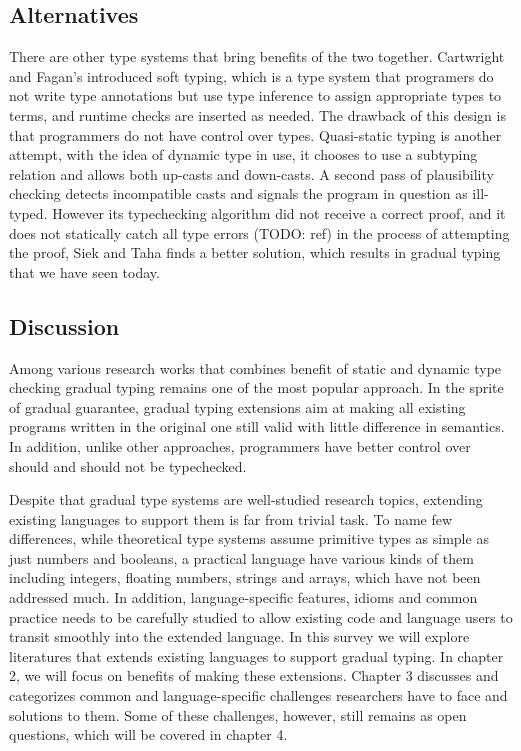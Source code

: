 \subsection{Alternatives}

There are other type systems that bring benefits of the two together.
Cartwright and Fagan's introduced soft typing, which is a type system
that programers do not write type annotations but use type inference to
assign appropriate types to terms, and runtime checks are inserted as needed.
The drawback of this design is that programmers do not have control over types.
Quasi-static typing is another attempt, with the idea of dynamic type in use,
it chooses to use a subtyping relation and allows both up-casts and down-casts.
A second pass of plausibility checking detects incompatible casts and signals the program
in question as ill-typed. However its typechecking algorithm did not receive a correct proof,
and it does not statically catch all type errors (TODO: ref)
in the process of attempting the proof, Siek and Taha finds a better solution, 
which results in gradual typing that we have seen today.

\subsection{Discussion}

Among various research works that combines
benefit of static and dynamic type checking
gradual typing remains one of the most popular approach.
In the sprite of gradual guarantee, gradual typing extensions aim at
making all existing programs written in the original one still valid with little difference in semantics.
In addition, unlike other approaches, programmers have better control over should and should not be typechecked.

Despite that gradual type systems are well-studied research topics,
extending existing languages to support them is far from trivial task.
To name few differences, while theoretical type systems assume primitive types as simple as just numbers and booleans,
a practical language have various kinds of them including integers, floating numbers, strings and arrays,
which have not been addressed much.
In addition, language-specific features, idioms and common practice needs
to be carefully studied to allow existing code and language users to transit smoothly into
the extended language. In this survey we will explore literatures that extends existing languages to support gradual typing.
In chapter 2, we will focus on benefits of making these extensions. Chapter 3 discusses and categorizes common and language-specific
challenges researchers have to face and solutions to them.
Some of these challenges, however, still remains as open questions, which will be covered in chapter 4.

